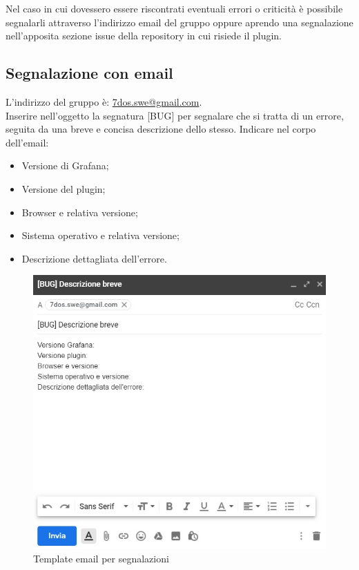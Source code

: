 Nel caso in cui dovessero essere riscontrati eventuali errori o criticità è possibile segnalarli attraverso l'indirizzo email del gruppo oppure aprendo una segnalazione nell'apposita sezione issue della repository in cui risiede il plugin.

\subsection{Segnalazione con email}
L'indirizzo del gruppo è: {\url{7dos.swe@gmail.com}}. \\
Inserire nell'oggetto la segnatura [BUG] per segnalare che si tratta di un errore, seguita da una breve e concisa descrizione dello stesso.
Indicare nel corpo dell'email:
\begin{itemize}
	\item Versione di Grafana;
	\item Versione del plugin;
	\item Browser e relativa versione;
	\item Sistema operativo e relativa versione;
	\item Descrizione dettagliata dell'errore.
\end{itemize}

\begin{figure} [H]
	\centering
	\includegraphics[scale=0.9]{Img/email.jpg} 
	\caption{Template email per segnalazioni} \label{} 
\end{figure} 

